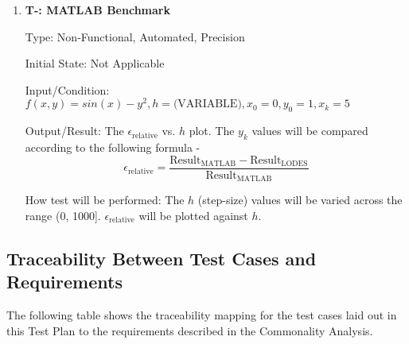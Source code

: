 \documentclass[12pt, titlepage]{article}
\newcounter{tnum} %
\newcommand{\famname}{LODES} %
\begin{document}
\begin{enumerate}

\item{\textbf{T-\thetnum \label{t-benchmark}: MATLAB Benchmark}}

Type: Non-Functional, Automated, Precision 
					
Initial State: Not Applicable
					
Input/Condition: $f(x, y) = sin(x) - y^2, h = \text{(VARIABLE)}, x_0 = 0, y_0 = 1, x_k = 5$
					
Output/Result: The $\epsilon_{\text{relative}}$ vs. $h$ plot.
The $y_k$ values will be compared according to the following formula -
$$\epsilon_{\text{relative}} = \frac{\text{Result}_\text{MATLAB} - \text{Result}_\text{\famname{}}} {\text{Result}
_\text{MATLAB}} $$
					
How test will be performed: The $h$ (step-size) values will be varied across the range (0, 1000]. 
$\epsilon_{\text{relative}}$ will be plotted against $h$.

\end{enumerate}

%
%					
%					
%					
%					

%

\subsection{Traceability Between Test Cases and Requirements}
The following table shows the traceability mapping for the test cases laid out in this Test Plan to the requirements 
described in the Commonality Analysis.
\end{document}
